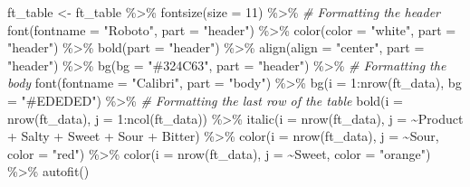\documentclass[
]{book}
\newenvironment{Shaded}{\begin{snugshade}}{\end{snugshade}}
\newcommand{\AttributeTok}[1]{\textcolor[rgb]{0.77,0.63,0.00}{#1}}
\newcommand{\CommentTok}[1]{\textcolor[rgb]{0.56,0.35,0.01}{\textit{#1}}}
\newcommand{\DecValTok}[1]{\textcolor[rgb]{0.00,0.00,0.81}{#1}}
\newcommand{\FunctionTok}[1]{\textcolor[rgb]{0.00,0.00,0.00}{#1}}
\newcommand{\NormalTok}[1]{#1}
\newcommand{\OtherTok}[1]{\textcolor[rgb]{0.56,0.35,0.01}{#1}}
\newcommand{\SpecialCharTok}[1]{\textcolor[rgb]{0.00,0.00,0.00}{#1}}
\newcommand{\StringTok}[1]{\textcolor[rgb]{0.31,0.60,0.02}{#1}}
\begin{document}
\begin{Shaded}
\begin{Highlighting}[]
\NormalTok{ft\_table }\OtherTok{\textless{}{-}}\NormalTok{ ft\_table }\SpecialCharTok{\%\textgreater{}\%} 
  \FunctionTok{fontsize}\NormalTok{(}\AttributeTok{size =} \DecValTok{11}\NormalTok{) }\SpecialCharTok{\%\textgreater{}\%}
  \CommentTok{\# Formatting the header}
  \FunctionTok{font}\NormalTok{(}\AttributeTok{fontname =} \StringTok{"Roboto"}\NormalTok{, }\AttributeTok{part =} \StringTok{"header"}\NormalTok{) }\SpecialCharTok{\%\textgreater{}\%}
  \FunctionTok{color}\NormalTok{(}\AttributeTok{color =} \StringTok{"white"}\NormalTok{, }\AttributeTok{part =} \StringTok{"header"}\NormalTok{) }\SpecialCharTok{\%\textgreater{}\%}
  \FunctionTok{bold}\NormalTok{(}\AttributeTok{part =} \StringTok{"header"}\NormalTok{) }\SpecialCharTok{\%\textgreater{}\%}
  \FunctionTok{align}\NormalTok{(}\AttributeTok{align =} \StringTok{"center"}\NormalTok{, }\AttributeTok{part =} \StringTok{"header"}\NormalTok{) }\SpecialCharTok{\%\textgreater{}\%}
  \FunctionTok{bg}\NormalTok{(}\AttributeTok{bg =} \StringTok{"\#324C63"}\NormalTok{, }\AttributeTok{part =} \StringTok{"header"}\NormalTok{) }\SpecialCharTok{\%\textgreater{}\%}
  \CommentTok{\# Formatting the body}
  \FunctionTok{font}\NormalTok{(}\AttributeTok{fontname =} \StringTok{"Calibri"}\NormalTok{, }\AttributeTok{part =} \StringTok{"body"}\NormalTok{) }\SpecialCharTok{\%\textgreater{}\%} 
  \FunctionTok{bg}\NormalTok{(}\AttributeTok{i =} \DecValTok{1}\SpecialCharTok{:}\FunctionTok{nrow}\NormalTok{(ft\_data), }\AttributeTok{bg =} \StringTok{"\#EDEDED"}\NormalTok{) }\SpecialCharTok{\%\textgreater{}\%} 
  \CommentTok{\# Formatting the last row of the table}
  \FunctionTok{bold}\NormalTok{(}\AttributeTok{i =} \FunctionTok{nrow}\NormalTok{(ft\_data), }\AttributeTok{j =} \DecValTok{1}\SpecialCharTok{:}\FunctionTok{ncol}\NormalTok{(ft\_data)) }\SpecialCharTok{\%\textgreater{}\%} 
  \FunctionTok{italic}\NormalTok{(}\AttributeTok{i =} \FunctionTok{nrow}\NormalTok{(ft\_data), }\AttributeTok{j =} \SpecialCharTok{\textasciitilde{}}\NormalTok{Product }\SpecialCharTok{+}\NormalTok{ Salty }\SpecialCharTok{+}\NormalTok{ Sweet }\SpecialCharTok{+}\NormalTok{ Sour }\SpecialCharTok{+}\NormalTok{ Bitter) }\SpecialCharTok{\%\textgreater{}\%}
  \FunctionTok{color}\NormalTok{(}\AttributeTok{i =}  \FunctionTok{nrow}\NormalTok{(ft\_data), }\AttributeTok{j =} \SpecialCharTok{\textasciitilde{}}\NormalTok{Sour, }\AttributeTok{color =} \StringTok{"red"}\NormalTok{) }\SpecialCharTok{\%\textgreater{}\%}
  \FunctionTok{color}\NormalTok{(}\AttributeTok{i =}  \FunctionTok{nrow}\NormalTok{(ft\_data), }\AttributeTok{j =} \SpecialCharTok{\textasciitilde{}}\NormalTok{Sweet, }\AttributeTok{color =} \StringTok{"orange"}\NormalTok{) }\SpecialCharTok{\%\textgreater{}\%} 
  \FunctionTok{autofit}\NormalTok{()}


\end{Highlighting}
\end{Shaded}
\end{document}
